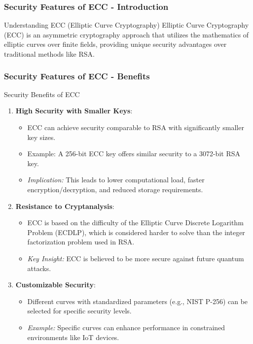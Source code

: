 \documentclass{beamer}
\begin{document}
\begin{frame}[fragile]
    \frametitle{Security Features of ECC - Introduction}
    \begin{block}{Understanding ECC (Elliptic Curve Cryptography)}
        Elliptic Curve Cryptography (ECC) is an asymmetric cryptography approach that utilizes the mathematics of elliptic curves over finite fields, providing unique security advantages over traditional methods like RSA.
    \end{block}
\end{frame}

\begin{frame}[fragile]
    \frametitle{Security Features of ECC - Benefits}
    \begin{block}{Security Benefits of ECC}
        \begin{enumerate}
            \item \textbf{High Security with Smaller Keys}:
            \begin{itemize}
                \item ECC can achieve security comparable to RSA with significantly smaller key sizes.
                \item Example: A 256-bit ECC key offers similar security to a 3072-bit RSA key.
                \item \textit{Implication:} This leads to lower computational load, faster encryption/decryption, and reduced storage requirements.
            \end{itemize}
            
            \item \textbf{Resistance to Cryptanalysis}:
            \begin{itemize}
                \item ECC is based on the difficulty of the Elliptic Curve Discrete Logarithm Problem (ECDLP), which is considered harder to solve than the integer factorization problem used in RSA.
                \item \textit{Key Insight:} ECC is believed to be more secure against future quantum attacks.
            \end{itemize}

            \item \textbf{Customizable Security}:
            \begin{itemize}
                \item Different curves with standardized parameters (e.g., NIST P-256) can be selected for specific security levels.
                \item \textit{Example:} Specific curves can enhance performance in constrained environments like IoT devices.
            \end{itemize}
        \end{enumerate}
    \end{block}
\end{frame}
\end{document}
